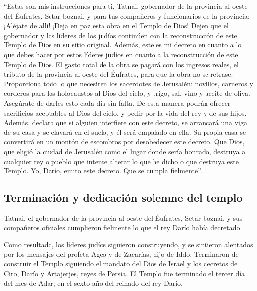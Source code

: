  ``Estas son mis instrucciones para ti, Tatnai, gobernador
de la provincia al oeste del Éufrates, Setar-boznai, y para tus
compañeros y funcionarios de la provincia: ¡Aléjate de allí!
 ¡Deja en paz esta obra en el Templo de Dios! Dejen que el
gobernador y los líderes de los judíos continúen con la reconstrucción
de este Templo de Dios en su sitio original.  Además, este
es mi decreto en cuanto a lo que debes hacer por estos líderes judíos en
cuanto a la reconstrucción de este Templo de Dios. El gasto total de la
obra se pagará con los ingresos reales, el tributo de la provincia al
oeste del Éufrates, para que la obra no se retrase. 
Proporciona todo lo que necesiten los sacerdotes de Jerusalén: novillos,
carneros y corderos para los holocaustos al Dios del cielo, y trigo,
sal, vino y aceite de oliva. Asegúrate de darles esto cada día sin
falta.  De esta manera podrán ofrecer sacrificios
aceptables al Dios del cielo, y pedir por la vida del rey y de sus
hijos.  Además, declaro que si alguien interfiere con
este decreto, se arrancará una viga de su casa y se clavará en el suelo,
y él será empalado en ella. Su propia casa se convertirá en un montón de
escombros por desobedecer este decreto.  Que Dios, que
eligió la ciudad de Jerusalén como el lugar donde sería honrado,
destruya a cualquier rey o pueblo que intente alterar lo que he dicho o
que destruya este Templo. Yo, Darío, emito este decreto. Que se cumpla
fielmente''.

\hypertarget{terminaciuxf3n-y-dedicaciuxf3n-solemne-del-templo}{%
\subsection{Terminación y dedicación solemne del
templo}\label{terminaciuxf3n-y-dedicaciuxf3n-solemne-del-templo}}

 Tatnai, el gobernador de la provincia al oeste del
Éufrates, Setar-boznai, y sus compañeros oficiales cumplieron fielmente
lo que el rey Darío había decretado.

 Como resultado, los líderes judíos siguieron
construyendo, y se sintieron alentados por los mensajes del profeta Ageo
y de Zacarías, hijo de Iddo. Terminaron de construir el Templo siguiendo
el mandato del Dios de Israel y los decretos de Ciro, Darío y
Artajerjes, reyes de Persia.  El Templo fue terminado el
tercer día del mes de Adar, en el sexto año del reinado del rey Darío.

